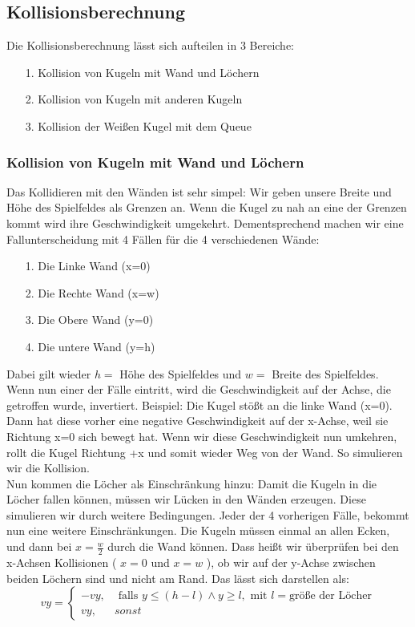 \subsection{Kollisionsberechnung}
	Die Kollisionsberechnung lässt sich aufteilen in 3 Bereiche: \begin{itemize}
		\item [1.] Kollision von Kugeln mit Wand und Löchern
		\item [2.] Kollision von Kugeln mit anderen Kugeln
		\item [3.] Kollision der Weißen Kugel mit dem Queue
	\end{itemize}
	\subsubsection{Kollision von Kugeln mit Wand und Löchern}
		Das Kollidieren mit den Wänden ist sehr simpel: Wir geben  unsere Breite und Höhe des Spielfeldes als Grenzen an. Wenn die Kugel zu nah an eine der Grenzen kommt wird ihre Geschwindigkeit umgekehrt. Dementsprechend machen wir eine Fallunterscheidung mit 4 Fällen für die 4 verschiedenen Wände: \begin{itemize}
			\item [1.] Die Linke Wand (x=0)
			\item [2.] Die Rechte Wand (x=w)
			\item [3.] Die Obere Wand (y=0)
			\item [4.] Die untere Wand (y=h)
		\end{itemize}
		Dabei gilt wieder $ h = $ Höhe des Spielfeldes und $ w = $ Breite des Spielfeldes. \\
		Wenn nun einer der Fälle eintritt, wird die Geschwindigkeit auf der Achse, die getroffen wurde, invertiert. Beispiel: Die Kugel stößt an die linke Wand (x=0). Dann hat diese vorher eine negative Geschwindigkeit auf der x-Achse, weil sie Richtung x=0 sich bewegt hat. Wenn wir diese Geschwindigkeit nun umkehren, rollt die Kugel Richtung +x und somit wieder Weg von der Wand. So simulieren wir die Kollision. \\
		Nun kommen die Löcher als Einschränkung hinzu: Damit die Kugeln in die Löcher fallen können, müssen wir Lücken in den Wänden erzeugen. Diese simulieren wir durch weitere Bedingungen. Jeder der 4 vorherigen Fälle, bekommt nun eine weitere Einschränkungen. Die Kugeln müssen einmal an allen Ecken, und dann bei $x= \frac{w}{2}$ durch die Wand können. Dass heißt wir überprüfen bei den x-Achsen Kollisionen ( $x=0$ und $x=w$ ), ob wir auf der y-Achse zwischen beiden Löchern sind und nicht am Rand. Das lässt sich darstellen als: \begin{equation}
		vy = \begin{cases}
			-vy, & \text{ falls } y \leq (h- l) \land y \geq l, \text{ mit } l = \text{größe der Löcher} \\
			vy, & sonst 
		\end{cases}
		\end{equation}

